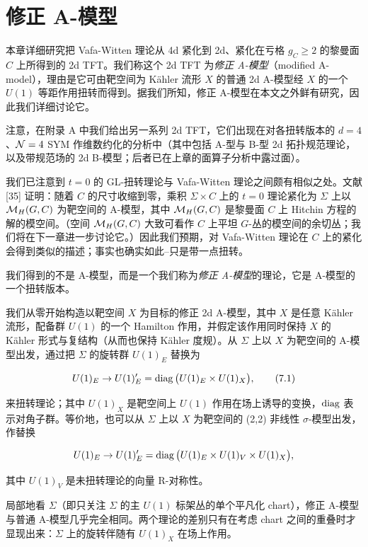 \chapter{修正 A-模型}

本章详细研究把 Vafa-Witten 理论从 4d 紧化到 2d、紧化在亏格 $g_C\geqslant 2$ 的黎曼面 $C$ 上所得到的 2d TFT。我们称这个 2d TFT 为\emph{修正 A-模型}（modified A-model），理由是它可由靶空间为 Kähler 流形 $X$ 的普通 2d A-模型经 $X$ 的一个 $U(1)$ 等距作用扭转而得到。据我们所知，修正 A-模型在本文之外鲜有研究，因此我们详细讨论它。

注意，在附录 A 中我们给出另一系列 2d TFT，它们出现在对各扭转版本的 $d=4$、$\mathcal{N}=4$ SYM 作维数约化的分析中（其中包括 A-型与 B-型 2d 拓扑规范理论，以及带规范场的 2d B-模型；后者已在上章的面算子分析中露过面）。


我们已注意到 $t=0$ 的 GL-扭转理论与 Vafa-Witten 理论之间颇有相似之处。文献 [35] 证明：随着 $C$ 的尺寸收缩到零，乘积 $\Sigma\times C$ 上的 $t=0$ 理论紧化为 $\Sigma$ 上以 $\mathcal{M}_H(G,C)$ 为靶空间的 A-模型，其中 $\mathcal{M}_H(G,C)$ 是黎曼面 $C$ 上 Hitchin 方程的解的模空间。（空间 $\mathcal{M}_H(G,C)$ 大致可看作 $C$ 上平坦 $G$-丛的模空间的余切丛；我们将在下一章进一步讨论它。）因此我们预期，对 Vafa-Witten 理论在 $C$ 上的紧化会得到类似的描述；事实也确实如此--只是带一点扭转。

我们得到的不是 A-模型，而是一个我们称为\emph{修正 A-模型}的理论，它是 A-模型的一个扭转版本。

我们从零开始构造以靶空间 $X$ 为目标的修正 2d A-模型，其中 $X$ 是任意 Kähler 流形，配备群 $U(1)$ 的一个 Hamilton 作用，并假定该作用同时保持 $X$ 的 Kähler 形式与复结构（从而也保持 Kähler 度规）。从 $\Sigma$ 上以 $X$ 为靶空间的 A-模型出发，通过把 $\Sigma$ 的旋转群 $U(1)_E$ 替换为

\begin{equation}
U(1)_E \to U(1)'_E = \operatorname{diag}\big(U(1)_E\times U(1)_X\big), \tag{7.1}
\end{equation}

来扭转理论；其中 $U(1)_X$ 是靶空间上 $U(1)$ 作用在场上诱导的变换，$\operatorname{diag}$ 表示对角子群。等价地，也可以从 $\Sigma$ 上以 $X$ 为靶空间的 (2,2) 非线性 $\sigma$-模型出发，作替换

\[
U(1)_E \to U(1)'_E = \operatorname{diag}\big(U(1)_E\times U(1)_V\times U(1)_X\big),
\]

其中 $U(1)_V$ 是未扭转理论的向量 R-对称性。

局部地看 $\Sigma$（即只关注 $\Sigma$ 的主 $U(1)$ 标架丛的单个平凡化 chart），修正 A-模型与普通 A-模型几乎完全相同。两个理论的差别只有在考虑 chart 之间的重叠时才显现出来：$\Sigma$ 上的旋转伴随有 $U(1)_X$ 在场上作用。

